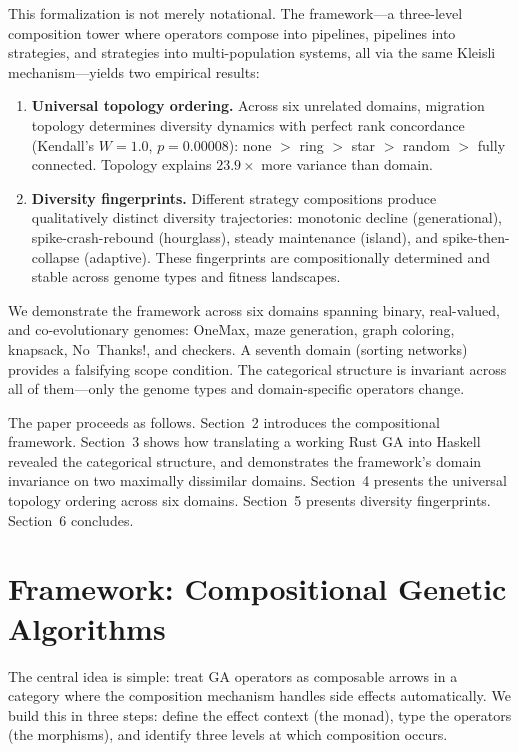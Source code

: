 \documentclass[dvipsnames,format=sigconf,anonymous=false,review=false]{acmart}
\begin{document}
This formalization is not merely notational. The framework---a three-level composition tower where operators compose into pipelines, pipelines into strategies, and strategies into multi-population systems, all via the same Kleisli mechanism---yields two empirical results:

\begin{enumerate}[nosep]
  \item \textbf{Universal topology ordering.} Across six unrelated domains, migration topology determines diversity dynamics with perfect rank concordance (Kendall's $W = 1.0$, $p = 0.00008$): none $>$ ring $>$ star $>$ random $>$ fully connected. Topology explains $23.9\times$ more variance than domain.

  \item \textbf{Diversity fingerprints.} Different strategy compositions produce qualitatively distinct diversity trajectories: monotonic decline (generational), spike-crash-rebound (hourglass), steady maintenance (island), and spike-then-collapse (adaptive). These fingerprints are compositionally determined and stable across genome types and fitness landscapes.
\end{enumerate}

We demonstrate the framework across six domains spanning binary, real-valued, and co-evolutionary genomes: OneMax, maze generation, graph coloring, knapsack, No~Thanks!, and checkers. A seventh domain (sorting networks) provides a falsifying scope condition. The categorical structure is invariant across all of them---only the genome types and domain-specific operators change.

The paper proceeds as follows. Section~2 introduces the compositional framework. Section~3 shows how translating a working Rust GA into Haskell revealed the categorical structure, and demonstrates the framework's domain invariance on two maximally dissimilar domains. Section~4 presents the universal topology ordering across six domains. Section~5 presents diversity fingerprints. Section~6 concludes.

\section{Framework: Compositional Genetic Algorithms}

The central idea is simple: treat GA operators as composable arrows in a category where the composition mechanism handles side effects automatically. We build this in three steps: define the effect context (the monad), type the operators (the morphisms), and identify three levels at which composition occurs.
\end{document}

